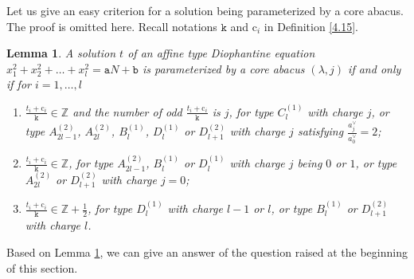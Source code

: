 \documentclass[11pt]{amsart}
\theoremstyle{plain}
\numberwithin{equation}{subsection}
\newtheorem{lemma}[theorem]{Lemma}
\newcommand{\lam}{\lambda}
\begin{document}
Let us give an easy criterion for a solution being parameterized by a core abacus. The proof is omitted here. 
Recall notations $\mathtt{k}$ and $\mathrm{c}_i$ in Definition \ref{4.15}.

\begin{lemma}\label{6.1}
A solution $t$ of an affine type Diophantine equation $x_1^2+x_2^2+\dots+x_l^2=\mathtt{a}N+\mathtt{b}$
is parameterized by a core abacus $(\lam, j)$ if and only if for $i=1, \dots, l$
\begin{enumerate}
\item [{\rm (1)}] $\frac{t_i+\mathrm{c}_i}{\mathtt{k}}\in\mathbb{Z}$
and the number of odd $\frac{t_i+\mathrm{c}_i}{\mathtt{k}}$ is $j$, for type
$C_l^{(1)}$ with charge $j$, 
or type $A_{2l-1}^{(2)}$, $A_{2l}^{(2)}$, $B_l^{(1)}$, $D_l^{(1)}$ or $D_{l+1}^{(2)}$ with charge $j$ satisfying $\frac{a_j^\vee}{a_0^\vee}=2$;
\item [{\rm (2)}] $\frac{t_i+\mathrm{c}_i}{\mathtt{k}}\in\mathbb{Z}$, for type
  $A_{2l-1}^{(2)}$, $B_l^{(1)}$ or $D_l^{(1)}$ with charge $j$ being $0$ or $1$, or type $A_{2l}^{(2)}$ or $D_{l+1}^{(2)}$ with charge $j=0$;
\item [{\rm (3)}] $\frac{t_i+\mathrm{c}_i}{\mathtt{k}}\in\mathbb{Z}+\frac{1}{2}$, for type
$D_l^{(1)}$ with charge $l-1$ or $l$, or type $B_{l}^{(1)}$ or $D_{l+1}^{(2)}$ with charge $l$.
\end{enumerate}
\end{lemma}

Based on Lemma \ref{6.1}, we can give an answer of the question raised at the beginning of this section.
\end{document}
